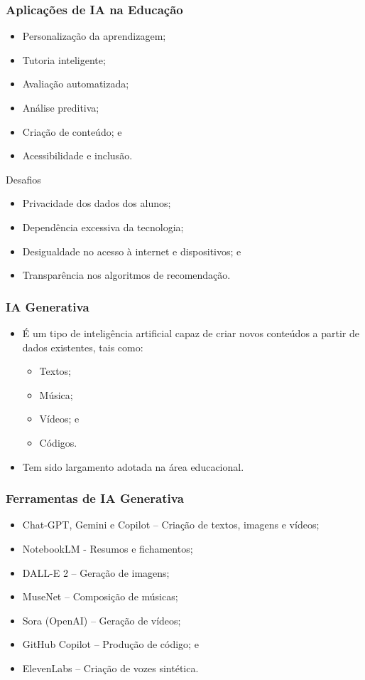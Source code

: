 \documentclass[aspectratio=169]{beamer} %
\begin{document}
\begin{frame}
	\frametitle{Aplicações de IA na Educação}
	
	\begin{itemize}
		\item Personalização da aprendizagem;
		\item Tutoria inteligente;
		\item Avaliação automatizada;
		\item Análise preditiva;
		\item Criação de conteúdo; e
		\item Acessibilidade e inclusão.
	\end{itemize}
\end{frame}

\begin{frame}{Desafios}
	
	\begin{itemize}
		\item Privacidade dos dados dos alunos;
		\item Dependência excessiva da tecnologia;
		\item Desigualdade no acesso à internet e dispositivos; e
		\item Transparência nos algoritmos de recomendação.
	\end{itemize}
\end{frame}

\begin{frame}
	\frametitle{IA Generativa}
	
	\begin{itemize}
		\item É um tipo de inteligência artificial capaz de criar novos conteúdos a partir de dados existentes, tais como:
		\begin{itemize}
			\item Textos;
			\item Música;
			\item Vídeos; e
			\item Códigos.
		\end{itemize}		
		\item Tem sido largamento adotada na área educacional.
	\end{itemize}
\end{frame}

\begin{frame}
	\frametitle{Ferramentas de IA Generativa}
	
	\begin{itemize}
		\item Chat-GPT, Gemini e Copilot -- Criação de textos, imagens e vídeos; 
		\item NotebookLM - Resumos e fichamentos;
		\item DALL-E 2 -- Geração de imagens;
		\item MuseNet -- Composição de músicas;
		\item Sora (OpenAI) -- Geração de vídeos;
		\item GitHub Copilot -- Produção de código; e
		\item ElevenLabs -- Criação de vozes sintética.
	\end{itemize}
\end{frame}
\end{document}
